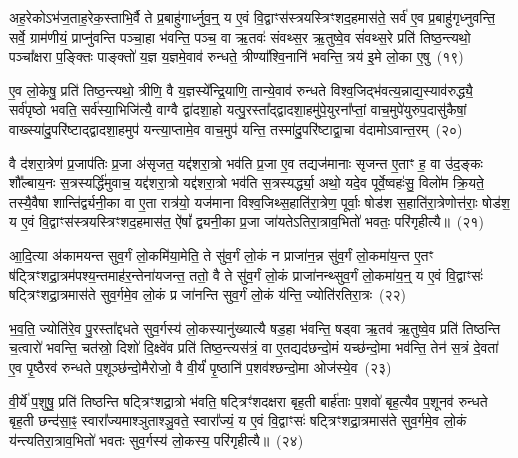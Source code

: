 अह॒रेको\-ऽभ॑ज॒ताह॒रेक॒स्ताभि॒र्वै ते प्र॒बाहु॑गार्ध्नुव॒न्॒ य ए॒वं वि॒द्वाꣳस॑स्त्रयस्त्रिꣳशद॒हमास॑ते॒ सर्व॑ ए॒व प्र॒बाहु॑गृध्नुवन्ति॒ सर्वे॒ ग्राम॑णीयं॒ प्राप्नु॑वन्ति पञ्चा॒हा भ॑वन्ति॒ पञ्च॒ वा ऋ॒तवः॑ संवथ्स॒र ऋ॒तुष्वे॒व सं॑वथ्स॒रे प्रति॑ तिष्ठ॒न्त्यथो॒ पञ्चा᳚क्षरा प॒ङ्क्तिः पाङ्क्तो॑ य॒ज्ञ य॒ज्ञमे॒वाव॑ रुन्धते॒ त्रीण्या᳚श्वि॒नानि॑ भवन्ति॒ त्रय॑ इ॒मे लो॒का ए॒षु~(१९)

ए॒व लो॒केषु॒ प्रति॑ तिष्ठ॒न्त्यथो॒ त्रीणि॒ वै य॒ज्ञस्ये᳚न्द्रि॒याणि॒ तान्ये॒वाव॑ रुन्धते विश्व॒जिद्भ॑वत्य॒न्नाद्य॒स्याव॑रुद्ध्यै॒ सर्व॑पृष्ठो भवति॒ सर्व॑स्या॒भिजि॑त्यै॒ वाग्वै द्वा॑दशा॒हो यत्पु॒रस्ता᳚द्द्वादशा॒हमु॑पे॒युरना᳚प्तां॒ वाच॒मुपे॑युरुप॒दासु॑कैषां॒ वाख्स्या॑दु॒परि॑ष्टाद्द्वादशा॒हमुप॑ यन्त्या॒प्तामे॒व वाच॒मुप॑ यन्ति॒ तस्मा॑दु॒परि॑ष्टाद्वा॒चा व॑दामो\-ऽवान्त॒रम्~(२०)

वै द॑शरा॒त्रेण॑ प्र॒जा\-प॑तिः प्र॒जा अ॑सृजत॒ यद्द॑शरा॒त्रो भव॑ति प्र॒जा ए॒व तद्यज॑मानाः सृजन्त ए॒ताꣳ ह॒ वा उ॑द॒ङ्कः शौ᳚ल्बाय॒नः स॒त्रस्यर्द्धि॑मुवाच॒ यद्द॑शरा॒त्रो यद्द॑शरा॒त्रो भव॑ति स॒त्रस्यर्द्ध्या॒ अथो॒ यदे॒व पूर्वे॒ष्वहः॑सु॒ विलो॑म क्रि॒यते॒ तस्यै॒वैषा शान्ति॑र्द्व्यनी॒का वा ए॒ता रात्र॑यो॒ यज॑माना विश्व॒जिथ्स॒हाति॑रा॒त्रेण॒ पूर्वाः॒ षोड॑श स॒हाति॑रा॒त्रेणोत्त॑राः॒ षोड॑श॒ य ए॒वं वि॒द्वाꣳस॑स्त्रयस्त्रिꣳशद॒हमास॑त॒ ऐ॑षां᳚ द्व्यनी॒का प्र॒जा जा॑यते\-ऽतिरा॒त्राव॒भितो॑ भवतः॒ परि॑गृहीत्यै॥~(२१)

{\anuvakamend[{अ॒ह॒र॒न्ने॒ष्व॑वान्त॒रꣳ षोड॑श स॒ह स॒प्तद॑श च}]}%

आ॒दि॒त्या अ॑कामयन्त सुव॒र्गं लो॒कमि॑या॒मेति॒ ते सु॑व॒र्गं लो॒कं न प्राजा॑न॒न्न सु॑व॒र्गं लो॒कमा॑य॒न्त ए॒तꣳ ष॑ट्त्रिꣳशद्रा॒त्रम॑पश्य॒न्तमाह॑र॒न्तेना॑यजन्त॒ ततो॒ वै ते सु॑व॒र्गं लो॒कं प्राजा॑नन्थ्सुव॒र्गं लो॒कमा॑य॒न्॒ य ए॒वं वि॒द्वाꣳसः॑ षट्त्रिꣳशद्रा॒त्रमास॑ते सुव॒र्गमे॒व लो॒कं प्र जा॑नन्ति सुव॒र्गं लो॒कं य॑न्ति॒ ज्योति॑रतिरा॒त्रः~(२२)

भ॒व॒ति॒ ज्योति॑रे॒व पु॒रस्ता᳚द्दधते सुव॒र्गस्य॑ लो॒कस्यानु॑ख्यात्यै षड॒हा भ॑वन्ति॒ षड्वा ऋ॒तव॑ ऋ॒तुष्वे॒व प्रति॑ तिष्ठन्ति च॒त्वारो॑ भवन्ति॒ चत॑स्रो॒ दिशो॑ दि॒क्ष्वे॑व प्रति॑ तिष्ठ॒न्त्यस॑त्रं॒ वा ए॒तद्यद॑छन्दो॒मं यच्छ॑न्दो॒मा भव॑न्ति॒ तेन॑ स॒त्रं दे॒वता॑ ए॒व पृ॒ष्ठैरव॑ रुन्धते प॒शूञ्छ॑न्दो॒मैरोजो॒ वै वी॒र्यं॑ पृ॒ष्ठानि॑ प॒शव॑श्छन्दो॒मा ओज॑स्ये॒व~(२३)

वी॒र्ये॑ प॒शुषु॒ प्रति॑ तिष्ठन्ति षट्त्रिꣳशद्रा॒त्रो भ॑वति॒ षट्त्रिꣳ॑शदक्षरा बृह॒ती बार्\mbox{}ह॑ताः प॒शवो॑ बृह॒त्यैव प॒शूनव॑ रुन्धते बृह॒ती छन्द॑सा॒ꣴ॒ स्वारा᳚ज्यमाश्ञुताश्ञु॒वते॒ स्वारा᳚ज्यं॒ य ए॒वं वि॒द्वाꣳसः॑ षट्त्रिꣳशद्रा॒त्रमास॑ते सुव॒र्गमे॒व लो॒कं य॑न्त्यतिरा॒त्राव॒भितो॑ भवतः सुव॒र्गस्य॑ लो॒कस्य॒ परि॑गृहीत्यै॥~(२४)

